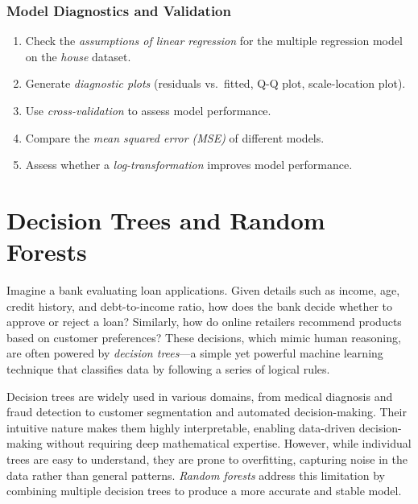 \documentclass[
]{book}
\providecommand{\tightlist}{%
  \setlength{\itemsep}{0pt}\setlength{\parskip}{0pt}}
\theoremstyle{definition}
\theoremstyle{definition}
\theoremstyle{definition}
\theoremstyle{definition}
\theoremstyle{remark}
\begin{document}
\subsection*{Model Diagnostics and Validation}\label{model-diagnostics-and-validation}

\begin{enumerate}
\def\labelenumi{\arabic{enumi}.}
\setcounter{enumi}{49}
\tightlist
\item
  Check the \emph{assumptions of linear regression} for the multiple regression model on the \emph{house} dataset.\\
\item
  Generate \emph{diagnostic plots} (residuals vs.~fitted, Q-Q plot, scale-location plot).\\
\item
  Use \emph{cross-validation} to assess model performance.\\
\item
  Compare the \emph{mean squared error (MSE)} of different models.\\
\item
  Assess whether a \emph{log-transformation} improves model performance.
\end{enumerate}

\chapter{Decision Trees and Random Forests}\label{chapter-tree}

Imagine a bank evaluating loan applications. Given details such as income, age, credit history, and debt-to-income ratio, how does the bank decide whether to approve or reject a loan? Similarly, how do online retailers recommend products based on customer preferences? These decisions, which mimic human reasoning, are often powered by \emph{decision trees}---a simple yet powerful machine learning technique that classifies data by following a series of logical rules.

Decision trees are widely used in various domains, from medical diagnosis and fraud detection to customer segmentation and automated decision-making. Their intuitive nature makes them highly interpretable, enabling data-driven decision-making without requiring deep mathematical expertise. However, while individual trees are easy to understand, they are prone to overfitting, capturing noise in the data rather than general patterns. \emph{Random forests} address this limitation by combining multiple decision trees to produce a more accurate and stable model.
\end{document}

